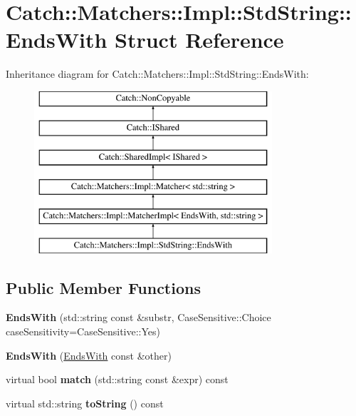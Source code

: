 \hypertarget{structCatch_1_1Matchers_1_1Impl_1_1StdString_1_1EndsWith}{}\section{Catch\+:\+:Matchers\+:\+:Impl\+:\+:Std\+String\+:\+:Ends\+With Struct Reference}
\label{structCatch_1_1Matchers_1_1Impl_1_1StdString_1_1EndsWith}
Inheritance diagram for Catch\+:\+:Matchers\+:\+:Impl\+:\+:Std\+String\+:\+:Ends\+With\+:\begin{figure}[H]
\begin{center}
\leavevmode
\includegraphics[height=6.000000cm]{structCatch_1_1Matchers_1_1Impl_1_1StdString_1_1EndsWith}
\end{center}
\end{figure}
\subsection*{Public Member Functions}
\begin{DoxyCompactItemize}
\item 
\mbox{\label{structCatch_1_1Matchers_1_1Impl_1_1StdString_1_1EndsWith_ae90c02ff06c9dd5e62218b2b521e8cab}} 
{\bfseries Ends\+With} (std\+::string const \&substr, Case\+Sensitive\+::\+Choice case\+Sensitivity=Case\+Sensitive\+::\+Yes)
\item 
\mbox{\label{structCatch_1_1Matchers_1_1Impl_1_1StdString_1_1EndsWith_a9321aac07fb17613a7993e99003b3be2}} 
{\bfseries Ends\+With} (\hyperlink{structCatch_1_1Matchers_1_1Impl_1_1StdString_1_1EndsWith}{Ends\+With} const \&other)
\item 
\mbox{\label{structCatch_1_1Matchers_1_1Impl_1_1StdString_1_1EndsWith_aff66fb5af2d4f6161627cb20899b2c1b}} 
virtual bool {\bfseries match} (std\+::string const \&expr) const
\item 
\mbox{\label{structCatch_1_1Matchers_1_1Impl_1_1StdString_1_1EndsWith_a2a4675e3d2369d587af36f051fb7964f}} 
virtual std\+::string {\bfseries to\+String} () const
\end{DoxyCompactItemize}

